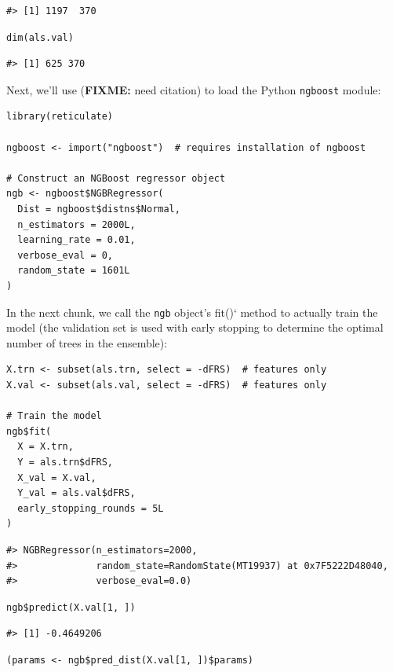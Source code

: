 \begin{verbatim}
#> [1] 1197  370
\end{verbatim}

\begin{verbatim}
dim(als.val)
\end{verbatim}

\begin{verbatim}
#> [1] 625 370
\end{verbatim}

Next, we'll use  (\textbf{FIXME:} need citation) to load the Python \texttt{ngboost} module:

\begin{verbatim}
library(reticulate)

ngboost <- import("ngboost")  # requires installation of ngboost

# Construct an NGBoost regressor object
ngb <- ngboost$NGBRegressor(
  Dist = ngboost$distns$Normal,
  n_estimators = 2000L,
  learning_rate = 0.01,
  verbose_eval = 0,
  random_state = 1601L
)
\end{verbatim}

In the next chunk, we call the \texttt{ngb} object's fit()` method to actually train the model (the validation set is used with early stopping to determine the optimal number of trees in the ensemble):

\begin{verbatim}
X.trn <- subset(als.trn, select = -dFRS)  # features only
X.val <- subset(als.val, select = -dFRS)  # features only

# Train the model
ngb$fit(
  X = X.trn,
  Y = als.trn$dFRS,
  X_val = X.val,
  Y_val = als.val$dFRS,
  early_stopping_rounds = 5L
)
\end{verbatim}

\begin{verbatim}
#> NGBRegressor(n_estimators=2000,
#>              random_state=RandomState(MT19937) at 0x7F5222D48040,
#>              verbose_eval=0.0)
\end{verbatim}

\begin{verbatim}
ngb$predict(X.val[1, ])
\end{verbatim}

\begin{verbatim}
#> [1] -0.4649206
\end{verbatim}

\begin{verbatim}
(params <- ngb$pred_dist(X.val[1, ])$params)
\end{verbatim}

